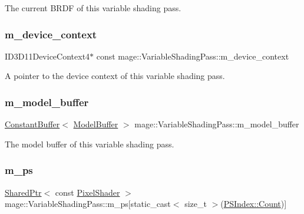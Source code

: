 The current B\+R\+DF of this variable shading pass. \hypertarget{classmage_1_1_variable_shading_pass_a6f493a69566574b4818e2ba578ec0c1a}{}\label{classmage_1_1_variable_shading_pass_a6f493a69566574b4818e2ba578ec0c1a} 
\subsubsection{\texorpdfstring{m\+\_\+device\+\_\+context}{m\_device\_context}}
{\footnotesize\ttfamily I\+D3\+D11\+Device\+Context4$\ast$ const mage\+::\+Variable\+Shading\+Pass\+::m\+\_\+device\+\_\+context\hspace{0.3cm}{\ttfamily [private]}}

A pointer to the device context of this variable shading pass. \hypertarget{classmage_1_1_variable_shading_pass_ab83602f0ffa6c0a3519ffaa467ae113a}{}\label{classmage_1_1_variable_shading_pass_ab83602f0ffa6c0a3519ffaa467ae113a} 
\subsubsection{\texorpdfstring{m\+\_\+model\+\_\+buffer}{m\_model\_buffer}}
{\footnotesize\ttfamily \hyperlink{classmage_1_1_constant_buffer}{Constant\+Buffer}$<$ \hyperlink{structmage_1_1_model_buffer}{Model\+Buffer} $>$ mage\+::\+Variable\+Shading\+Pass\+::m\+\_\+model\+\_\+buffer\hspace{0.3cm}{\ttfamily [private]}}

The model buffer of this variable shading pass. \hypertarget{classmage_1_1_variable_shading_pass_aacd5b6b967a0fcfe7510e289c3d630a0}{}\label{classmage_1_1_variable_shading_pass_aacd5b6b967a0fcfe7510e289c3d630a0} 
\subsubsection{\texorpdfstring{m\+\_\+ps}{m\_ps}}
{\footnotesize\ttfamily \hyperlink{namespacemage_a1e01ae66713838a7a67d30e44c67703e}{Shared\+Ptr}$<$ const \hyperlink{namespacemage_a27ecaf266420ee7a494d64edc0757129}{Pixel\+Shader} $>$ mage\+::\+Variable\+Shading\+Pass\+::m\+\_\+ps\mbox{[}static\+\_\+cast$<$ size\+\_\+t $>$(\hyperlink{classmage_1_1_variable_shading_pass_a99a5986785950a884405617f8d05cae5ae93f994f01c537c4e2f7d8528c3eb5e9}{P\+S\+Index\+::\+Count})\mbox{]}\hspace{0.3cm}{\ttfamily [private]}}


